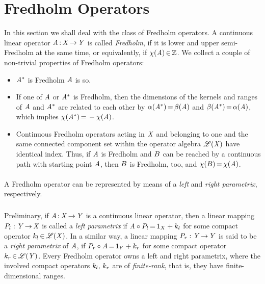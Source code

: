 \documentclass[11pt,twoside]{article}
\begin{document}
\section{Fredholm Operators}
In this section we shall deal with the class of Fredholm operators.
A continuous linear operator $\mathit{A} {\,:\,} \mathit{X} {\,\to\,} \mathit{Y}$
is called \textit{Fredholm},
if it is lower and upper semi-Fredholm at the same time,
or equivalently,
if $\chi(\mathit{A}) {\,\in\,} {\mathbb{Z}}$.
We collect a couple of non-trivial properties of Fredholm operators:

\begin{itemize}[leftmargin=15pt]
\item[(a)]
$\mathit{A}^*$ is Fredholm \iff $\mathit{A}$ is so.

\item[(b)]
If one of $\mathit{A}$ or $\mathit{A}^*$ is Fredholm,
then the dimensions of the kernels and ranges of $\mathit{A}$ and $\mathit{A}^*$
are related to each other by
$\alpha(\mathit{A}^*) {\,=\,} \beta(\mathit{A})$ and
$\beta(\mathit{A}^*) {\,=\,} \alpha(\mathit{A})$,
which implies $\chi(\mathit{A}^*) {\,=\,} - \chi(\mathit{A})$.

\item[(c)]
Continuous Fredholm operators acting in $\mathit{X}$ and
belonging to one and the same connected component set
within the operator algebra $\mathscr{L}(\mathit{X})$ have identical index.
Thus,
if $\mathit{A}$ is Fredholm and ${B}$ can be reached by a continuous path
with starting point $\mathit{A}$,
then ${B}$ is Fredholm, too,
and $\chi({B}) {\,=\,} \chi(\mathit{A})$.
\end{itemize}

\paragraph*{} %
A Fredholm operator can be represented by means of
a \textit{left} and \textit{right parametrix},
respectively.

\subparagraph*{}
Preliminary,
if $\mathit{A} {\,:\,} \mathit{X} {\,\to\,} \mathit{Y}$ is a continuous linear operator,
then a linear mapping $P_l:\mathit{Y} {\,\to\,} \mathit{X}$ is called a \textit{left parametrix}
if $\mathit{A} \circ P_l {\,=\,} {\mathsf{1}}_X + k_l$
for some compact operator $k_l {\,\in\,} \mathscr{L}(\mathit{X})$.
In a similar way,
a linear mapping $P_r:\mathit{Y} {\,\to\,} \mathit{Y}$
is said to be a \textit{right parametrix} of $\mathit{A}$,
if $P_r \circ \mathit{A} {\,=\,} {\mathsf{1}}_Y + k_r$
for some compact operator $k_r {\,\in\,} \mathscr{L}(\mathit{Y})$.
Every Fredholm operator owns a left and right parametrix,
where the involved compact operators $k_l,\,k_r$
are of \textit{finite-rank},
that is,
they have finite-dimensional ranges.
\end{document}
